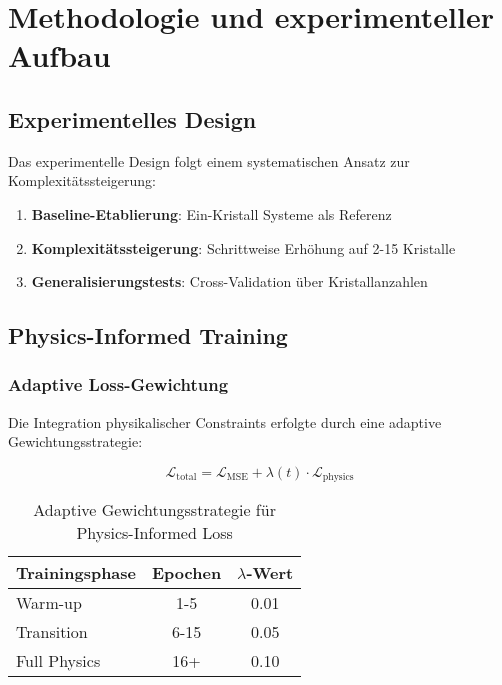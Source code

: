 
\chapter{Methodologie und experimenteller Aufbau}
\label{ch:methodology}

\section{Experimentelles Design}

Das experimentelle Design folgt einem systematischen Ansatz zur Komplexitätssteigerung:

\begin{enumerate}
    \item \textbf{Baseline-Etablierung}: Ein-Kristall Systeme als Referenz
    \item \textbf{Komplexitätssteigerung}: Schrittweise Erhöhung auf 2-15 Kristalle
    \item \textbf{Generalisierungstests}: Cross-Validation über Kristallanzahlen
\end{enumerate}

\section{Physics-Informed Training}
\label{sec:physics_informed}

\subsection{Adaptive Loss-Gewichtung}

Die Integration physikalischer Constraints erfolgte durch eine adaptive Gewichtungsstrategie:

\begin{equation}
\mathcal{L}_{\text{total}} = \mathcal{L}_{\text{MSE}} + \lambda(t) \cdot \mathcal{L}_{\text{physics}}
\end{equation}

\begin{table}[htbp]
\centering
\caption{Adaptive Gewichtungsstrategie für Physics-Informed Loss}
\label{tab:lambda_schedule}
\begin{tabular}{@{}lcc@{}}
\toprule
\textbf{Trainingsphase} & \textbf{Epochen} & \textbf{$\lambda$-Wert} \\
\midrule
Warm-up & 1-5 & 0.01 \\
Transition & 6-15 & 0.05 \\
Full Physics & 16+ & 0.10 \\
\bottomrule
\end{tabular}
\end{table}

